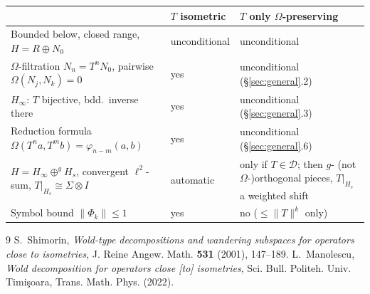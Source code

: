 \documentclass[11pt,a4paper]{article}
\theoremstyle{definition}
\theoremstyle{remark}
\newcommand{\Om}{\Omega}
\begin{document}
\begin{center}
\begin{tabular}{p{6.7cm}p{3.1cm}p{3.6cm}}
\toprule
 & \textbf{$T$ isometric} & \textbf{$T$ only $\Om$-preserving} \\
\midrule
Bounded below, closed range, $H=R\oplus N_0$ & unconditional & unconditional \\
$\Om$-filtration $N_n=T^nN_0$, pairwise $\Om(N_j,N_k)=0$ & yes & unconditional (\S\ref{sec:general}.2) \\
$H_\infty$: $T$ bijective, bdd.\ inverse there & yes & unconditional (\S\ref{sec:general}.3) \\
Reduction formula $\Om(T^na,T^mb)=\varphi_{n-m}(a,b)$ & yes & unconditional (\S\ref{sec:general}.6) \\
$H=H_\infty\oplus^gH_s$, convergent $\ell^2$-sum, $T|_{H_s}\cong\Sigma\otimes I$ & automatic & only if $T\in\mathcal D$; then $g$- (not $\Om$-)orthogonal pieces, $T|_{H_s}$ a weighted shift \\
Symbol bound $\|\Phi_k\|\le1$ & yes & no ($\le\|T\|^k$ only) \\
\bottomrule
\end{tabular}
\end{center}

\begin{thebibliography}{9}
 S.~Shimorin, \emph{Wold-type decompositions and wandering
subspaces for operators close to isometries}, J. Reine Angew. Math. \textbf{531} (2001),
147--189.
 L.~Manolescu, \emph{Wold decomposition for operators close [to]
isometries}, Sci. Bull. Politeh. Univ. Timi\c{s}oara, Trans. Math. Phys. (2022).
\end{thebibliography}
\end{document}
